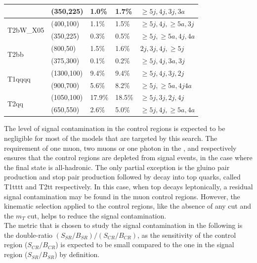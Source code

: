 \begin{table}[h!]
\begin{tabular}{ lllll }
     & (350,225)  & 1.0\%   & 1.7\% & $\geq5j,4j,3j,3a$ \\ \hline
    \multirow{2}{*}{T2bW\_X05}
     & (400,100)  & 1.1\%   & 1.5\% & $\geq5j,4j,\geq5a,3j$ \\
     & (350,225)  & 0.3\%   & 0.5\% & $\geq5j,\geq5a,4j,4a$ \\ \hline           
    \multirow{2}{*}{T2bb}
     & (800,50)   & 1.5\%   & 1.6\% & $2j,3j,4j,\geq5j$ \\
     & (375,300)  & 0.1\%   & 0.2\% & $\geq5j,4j,3a,3j$ \\ \hline
    \multirow{2}{*}{T1qqqq}
     & (1300,100) & 9.4\%   & 9.4\% & $\geq5j,4j,3j,2j$ \\
     & (900,700)  & 5.6\%   & 8.2\% & $\geq5j,\geq5a,4j4a$ \\ \hline
    \multirow{2}{*}{T2qq}
     & (1050,100)   & 17.9\%   & 18.5\% & $\geq5j,3j,2j,4j$ \\
     & (650,550)  & 2.6\%   & 5.0\% & $\geq5j,4j,\geq5a,4a$ \\ \hline
     \hline
  \end{tabular}
\end{table}


The level of signal contamination in the control regions is expected to be negligible 
for most of the models that are targeted by this search. 
The requirement of one muon, two muons or one photon in the \mj, \mmj and \gj respectively 
ensures that the control regions are depleted from signal events, in the case where the final state is all-hadronic. 
The only partial exception is the gluino pair production and stop pair production followed by decay into top quarks, 
called T1tttt and T2tt respectively. 
In this case, when top decays leptonically, a residual signal contamination may be found in the muon control regions. 
However, the kinematic selection applied to the control regions, like the absence of any \alt cut and the $m_{T}$ cut, helps to reduce the signal contamination. \\
The metric that is chosen to study the signal contamination in the following is the double-ratio $(S_{SR}/B_{SR})/(S_{CR}/B_{CR})$, 
as the sensitivity of the control region ($S_{CR}/B_{CR}$) is expected to be small compared to the one in the signal region ($S_{SR}/B_{SR}$) by definition. 

